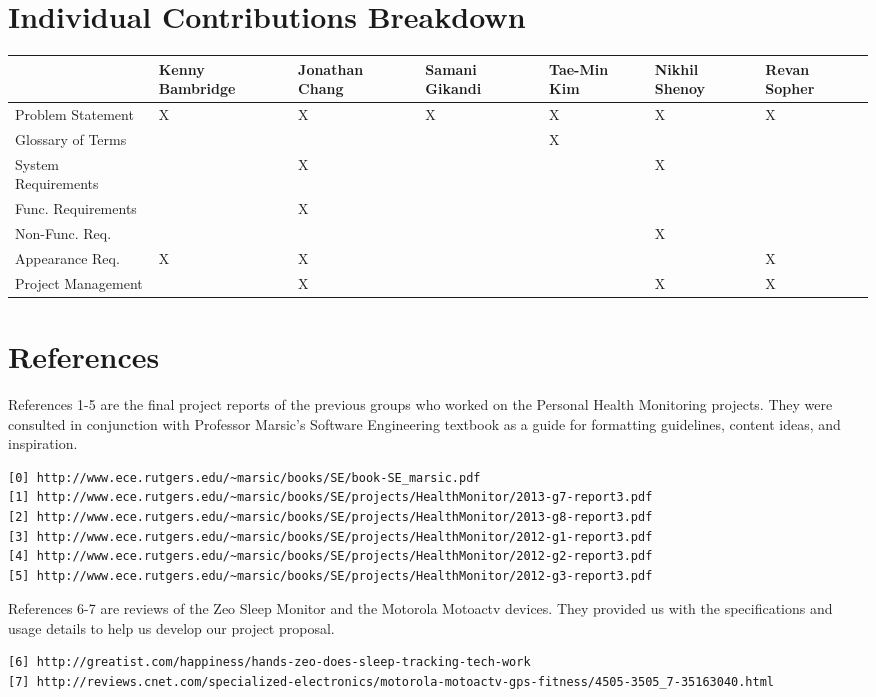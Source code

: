 \documentclass[letterpaper,english, 12pt]{scrreprt}
\begin{document}
\chapter*{Individual Contributions Breakdown}
\begin{center}
	\begin{tabular}{|l|C{2cm}|C{1.5cm}|C{1.5cm}|C{1.5cm}|C{1.5cm}|C{1.5cm}|}
		\hline
								&Kenny Bambridge&Jonathan Chang	&Samani Gikandi	&Tae-Min Kim&Nikhil Shenoy	&Revan Sopher\\ \hline
			Problem Statement	&		X		&		X		&		X		&		X	&		X		&		X\\ \hline
			Glossary of Terms	&				&				&				&		X	&				&		\\ \hline
			System Requirements	&				&		X		&				&			&		X		&		\\ \hline
			Func. Requirements	&				&		X		&				&			&				&		\\ \hline
			Non-Func. Req.		&				&				&				&			&		X		&		\\ \hline
			Appearance Req.		&		X		&		X		&				&			&				&		X\\ \hline
			Project Management	&				&		X		&				&			&		X		&		X\\ \hline
	\end{tabular}
\end{center}

\chapter*{References}

References 1-5 are the final project reports of the previous groups who worked on the Personal Health Monitoring projects. They were consulted in conjunction with Professor Marsic's Software Engineering textbook as a guide for formatting guidelines, content ideas, and inspiration. 
\begin{verbatim}
[0] http://www.ece.rutgers.edu/~marsic/books/SE/book-SE_marsic.pdf
[1] http://www.ece.rutgers.edu/~marsic/books/SE/projects/HealthMonitor/2013-g7-report3.pdf
[2] http://www.ece.rutgers.edu/~marsic/books/SE/projects/HealthMonitor/2013-g8-report3.pdf
[3] http://www.ece.rutgers.edu/~marsic/books/SE/projects/HealthMonitor/2012-g1-report3.pdf
[4] http://www.ece.rutgers.edu/~marsic/books/SE/projects/HealthMonitor/2012-g2-report3.pdf
[5] http://www.ece.rutgers.edu/~marsic/books/SE/projects/HealthMonitor/2012-g3-report3.pdf
\end{verbatim}
References 6-7 are reviews of the Zeo Sleep Monitor and the Motorola Motoactv devices. They provided us with the specifications and usage details to help us develop our project proposal.
\begin{verbatim}
[6] http://greatist.com/happiness/hands-zeo-does-sleep-tracking-tech-work
[7] http://reviews.cnet.com/specialized-electronics/motorola-motoactv-gps-fitness/4505-3505_7-35163040.html
\end{verbatim}
\end{document}
